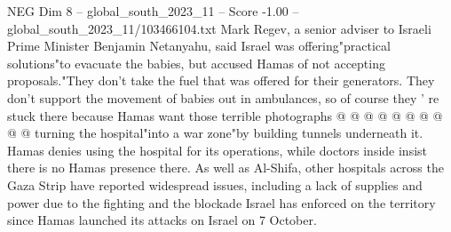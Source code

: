 \begin{textsample}{NEG Dim 8 – global\_south\_2023\_11 – Score -1.00 – global\_south\_2023\_11/103466104.txt}
Mark Regev, a senior adviser to Israeli Prime Minister Benjamin Netanyahu, said Israel was offering"practical solutions"to evacuate the babies, but accused Hamas of not accepting proposals."They don't take the fuel that was offered for their generators.
They don't support the movement of babies out in ambulances, so of course they ' re stuck there because Hamas want those terrible photographs @ @ @ @ @ @ @ @ @ @ turning the hospital"into a war zone"by building tunnels underneath it.
Hamas denies using the hospital for its operations, while doctors inside insist there is no Hamas presence there.
As well as Al-Shifa, other hospitals across the Gaza Strip have reported widespread issues, including a lack of supplies and power due to the fighting and the blockade Israel has enforced on the territory since Hamas launched its attacks on Israel on 7 October.

\end{textsample}
